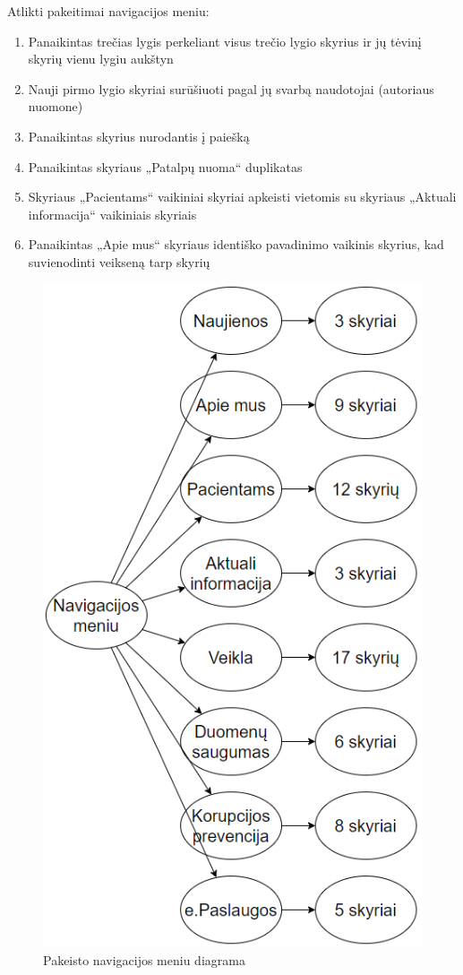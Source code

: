 \documentclass{VUMIFPSkursinis}
\begin{document}
Atlikti pakeitimai navigacijos meniu:
\begin{enumerate}
	\item Panaikintas trečias lygis perkeliant visus trečio lygio skyrius ir jų tėvinį skyrių vienu lygiu aukštyn
	\item Nauji pirmo lygio skyriai surūšiuoti pagal jų svarbą naudotojai (autoriaus nuomone)
	\item Panaikintas skyrius nurodantis į paiešką
	\item Panaikintas skyriaus „Patalpų nuoma“ duplikatas
	\item Skyriaus „Pacientams“ vaikiniai skyriai apkeisti vietomis su skyriaus „Aktuali informacija“ vaikiniais skyriais
	\item Panaikintas „Apie mus“ skyriaus identiško pavadinimo vaikinis skyrius, kad suvienodinti veikseną tarp skyrių
\end{enumerate}

\begin{figure}[htb]
    \centering
    \includegraphics[scale=0.8]{img/NavigacijosMeniuPakeistas}
    \caption{Pakeisto navigacijos meniu diagrama}
    \label{img:NavigacijosMeniuPakeistas}
\end{figure}
\end{document}

